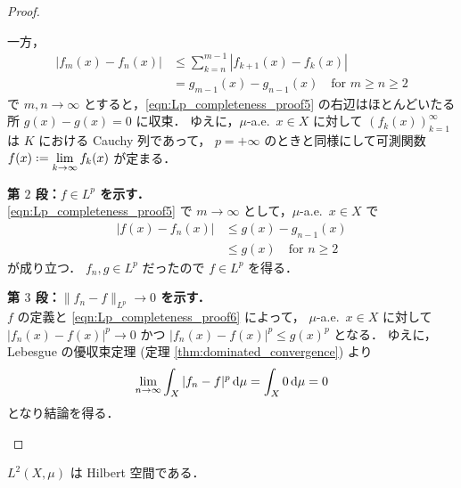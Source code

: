 \begin{proof}
\begin{itemize}[leftmargin=\parindent]
        一方，
        \begin{align}
            |f_m(x)-f_n(x)|
            &\le\sum_{k=n}^{m-1}|f_{k+1}(x)-f_k(x)|\nonumber\\
            &=g_{m-1}(x)-g_{n-1}(x)\quad\text{for $m\ge n\ge2$}\label{eqn:Lp_completeness_proof5}
        \end{align}
        で $m,n\to\infty$ とすると，\eqref{eqn:Lp_completeness_proof5} の右辺はほとんどいたる所 $g(x)-g(x)=0$ に収束．
        ゆえに，$\mu$-a.e.\ $x\in X$ に対して $(f_k(x))_{k=1}^\infty$ は $K$ における Cauchy 列であって，
        $p=+\infty$ のときと同様にして可測関数 $\displaystyle f(x)\defeq\lim_{k\to\infty}f_k(x)$ が定まる．

        \textbf{第 $2$ 段：$f\in L^p$ を示す．}\\
        \eqref{eqn:Lp_completeness_proof5} で $m\to\infty$ として，$\mu$-a.e.\ $x\in X$ で
        \begin{align}
            |f(x)-f_n(x)|
            &\le g(x)-g_{n-1}(x)\nonumber\\
            &\le g(x)\quad\text{for $n\ge2$}\label{eqn:Lp_completeness_proof6}
        \end{align}
        が成り立つ．
        $f_n,g\in L^p$ だったので $f\in L^p$ を得る．

        \textbf{第 $3$ 段：$\|f_n-f\|_{L^p}\to0$ を示す．}\\
        $f$ の定義と \eqref{eqn:Lp_completeness_proof6} によって，
        $\mu$-a.e.\ $x\in X$ に対して $|f_n(x)-f(x)|^p\to0$ かつ $|f_n(x)-f(x)|^p\le g(x)^p$ となる．
        ゆえに，Lebesgue の優収束定理 (定理 \ref{thm:dominated_convergence}) より
        \begin{align*}
            \lim_{n\to\infty}\int_X|f_n-f|^p\,\mathrm{d}\mu
            =\int_X0\,\mathrm{d}\mu=0
        \end{align*}
        となり結論を得る．
    \end{itemize}
\end{proof}

\begin{corollary}
    $L^2(X,\mu)$ は Hilbert 空間である．
\end{corollary}

